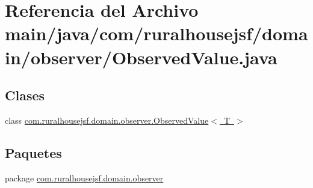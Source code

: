 \hypertarget{a00041}{}\section{Referencia del Archivo main/java/com/ruralhousejsf/domain/observer/\+Observed\+Value.java}
\label{a00041}
\subsection*{Clases}
\begin{DoxyCompactItemize}
\item 
class \mbox{\hyperlink{a00180}{com.\+ruralhousejsf.\+domain.\+observer.\+Observed\+Value$<$ T $>$}}
\end{DoxyCompactItemize}
\subsection*{Paquetes}
\begin{DoxyCompactItemize}
\item 
package \mbox{\hyperlink{a00116}{com.\+ruralhousejsf.\+domain.\+observer}}
\end{DoxyCompactItemize}
